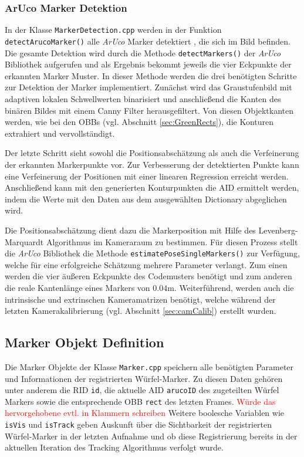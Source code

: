 \subsubsection{ArUco Marker Detektion}\label{sec:ArucoMarkerTracking}
 In der Klasse \texttt{MarkerDetection.cpp} werden in der Funktion \texttt{detect\-Aruco\-Marker()} alle \textit{ArUco} Marker detektiert \cite{article:Aruco2014}, die sich im Bild befinden. Die gesamte Detektion wird durch die Methode \texttt{detect\-Markers()} der \textit{ArUco} Bibliothek aufgerufen und als Ergebnis bekommt jeweils die vier Eckpunkte der erkannten Marker Muster. In dieser Methode werden die drei benötigten Schritte zur Detektion der Marker implementiert. Zunächst wird das Graustufenbild mit adaptiven lokalen Schwellwerten binarisiert und anschließend die Kanten des binären Bildes mit einem Canny Filter \cite{article:Canny} herausgefiltert. Von diesen Objektkanten werden, wie bei den OBBs (vgl. Abschnitt \ref{sec:GreenRects}), die Konturen extrahiert und vervollständigt.
  
 Der letzte Schritt sieht sowohl die Positionsabschätzung als auch die Verfeinerung der erkannten Markerpunkte vor. Zur Verbesserung der detektierten Punkte kann eine Verfeinerung der Positionen mit einer linearen Regression erreicht werden. Anschließend kann mit den generierten Konturpunkten die AID ermittelt werden, indem die Werte mit den Daten aus dem ausgewählten Dictionary abgeglichen wird.

 Die Positionsabschätzung dient dazu die Markerposition mit Hilfe des Levenberg-Marquardt Algorithmus \cite{article:Levenberg} im Kameraraum zu bestimmen. Für diesen Prozess stellt die \textit{ArUco} Bibliothek die Methode \texttt{esti\-mate\-Pose\-Single\-Markers()} zur Verfügung, welche für eine erfolgreiche Schätzung mehrere Parameter verlangt. Zum einen werden die vier äußeren Eckpunkte des Codemusters benötigt und zum anderen die reale Kantenlänge eines Markers von $0.04$m. Weiterführend, werden auch die intrinsische und extrinschen Kameramatrizen benötigt, welche während der letzten Kamerakalibrierung (vgl. Abschnitt \ref{sec:camCalib}) erstellt wurden.

 
\subsection{Marker Objekt Definition}\label{sec:MarkerObjekte}
Die Marker Objekte der Klasse \texttt{Marker.cpp} speichern alle benötigten Parameter und Informationen der registrierten Würfel-Marker. Zu diesen Daten gehören unter anderem die RID \texttt{id}, die aktuelle AID \texttt{arucoID} des zugeteilten Würfel Markers sowie die entsprechende OBB \texttt{rect} des letzten Frames. \textcolor{red}{Würde das hervorgehobene evtl. in Klammern schreiben} Weitere boolesche Variablen wie \texttt{isVis} und \texttt{isTrack} geben Auskunft über die Sichtbarkeit der registrierten Würfel-Marker in der letzten Aufnahme und ob diese Registrierung bereits in der aktuellen Iteration des Tracking Algorithmus verfolgt wurde.

